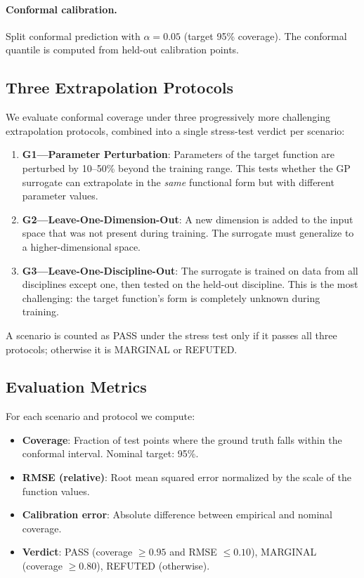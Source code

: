 \documentclass[journal]{IEEEtran}
\begin{document}
\paragraph{Conformal calibration.} Split conformal prediction with
$\alpha = 0.05$ (target 95\% coverage). The conformal quantile is computed
from held-out calibration points.

\subsection{Three Extrapolation Protocols}

We evaluate conformal coverage under three progressively more challenging
extrapolation protocols, combined into a single stress-test verdict per
scenario:

\begin{enumerate}
    \item \textbf{G1---Parameter Perturbation}: Parameters of the target
    function are perturbed by 10--50\% beyond the training range. This tests
    whether the GP surrogate can extrapolate in the \textit{same} functional
    form but with different parameter values.

    \item \textbf{G2---Leave-One-Dimension-Out}: A new dimension is added to
    the input space that was not present during training. The surrogate must
    generalize to a higher-dimensional space.

    \item \textbf{G3---Leave-One-Discipline-Out}: The surrogate is trained on
    data from all disciplines except one, then tested on the held-out
    discipline. This is the most challenging: the target function's form is
    completely unknown during training.
\end{enumerate}

A scenario is counted as PASS under the stress test only if it passes all
three protocols; otherwise it is MARGINAL or REFUTED.

\subsection{Evaluation Metrics}

For each scenario and protocol we compute:

\begin{itemize}
    \item \textbf{Coverage}: Fraction of test points where the ground truth
    falls within the conformal interval. Nominal target: 95\%.
    \item \textbf{RMSE (relative)}: Root mean squared error normalized by the
    scale of the function values.
    \item \textbf{Calibration error}: Absolute difference between empirical and
    nominal coverage.
    \item \textbf{Verdict}: PASS (coverage $\geq 0.95$ and RMSE $\leq 0.10$),
    MARGINAL (coverage $\geq 0.80$), REFUTED (otherwise).
\end{itemize}
\end{document}
